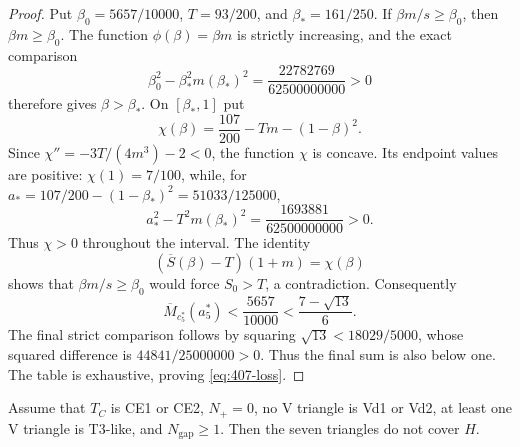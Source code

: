 \begin{proof}
Put $\beta_0=5657/10000$, $T=93/200$, and $\beta_*=161/250$.
If $\beta m/s\ge\beta_0$, then $\beta m\ge\beta_0$. The function
$\phi(\beta)=\beta m$ is strictly increasing, and the exact comparison
\[
 \beta_0^2-\beta_*^2m(\beta_*)^2
 =\frac{22782769}{62500000000}>0
\]
therefore gives $\beta>\beta_*$.  On $[\beta_*,1]$ put
\[
 \chi(\beta)=\frac{107}{200}-Tm-(1-\beta)^2.
\]
Since $\chi''=-3T/(4m^3)-2<0$, the function $\chi$ is concave. Its endpoint
values are positive: $\chi(1)=7/100$, while, for
$a_*=107/200-(1-\beta_*)^2=51033/125000$,
\[
 a_*^2-T^2m(\beta_*)^2
 =\frac{1693881}{62500000000}>0.
\]
Thus $\chi>0$ throughout the interval. The identity
\[
 (\overline S(\beta)-T)(1+m)=\chi(\beta)
\]
shows that $\beta m/s\ge\beta_0$ would force $S_0>T$, a contradiction.
Consequently
\[
 \overline M_{c_5^\ast}(a_5^\ast)<\frac{5657}{10000}
 <\frac{7-\sqrt{13}}6.
\]
The final strict comparison follows by squaring
$\sqrt{13}<18029/5000$, whose squared difference is
$44841/25000000>0$.
Thus the final sum is also below one.  The table is exhaustive, proving
\eqref{eq:407-loss}.
\end{proof}

\begin{proposition}[The nonzero-gap $N_+=0$ T3-like branch]
\label{prop:nplus-zero-t3}
Assume that $T_C$ is CE1 or CE2, $N_+=0$, no V triangle is Vd1 or Vd2,
at least one V triangle is T3-like, and $N_{\mathrm{gap}}\ge1$.  Then the
seven triangles do not cover $H$.
\end{proposition}

